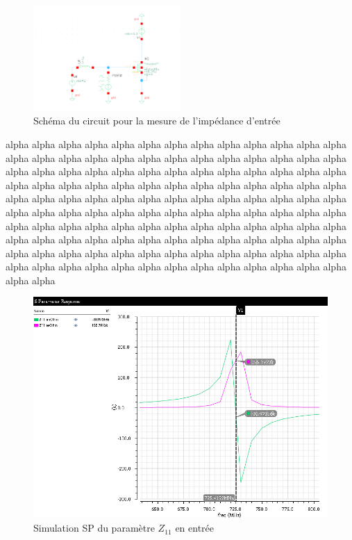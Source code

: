 \documentclass[a4paper]{article}
\begin{document}
\begin{figure}
\centering
\includegraphics[width=0.5\textwidth]{arch-transistor-input-impedance.png}
\caption{Sch\'ema du circuit pour la mesure de l'imp\'edance d'entr\'ee}
\end{figure}

alpha alpha alpha alpha alpha alpha alpha alpha alpha alpha alpha alpha
alpha alpha alpha alpha alpha alpha alpha alpha alpha alpha alpha alpha
alpha alpha alpha alpha alpha alpha alpha alpha alpha alpha alpha alpha
alpha alpha alpha alpha alpha alpha alpha alpha alpha alpha alpha alpha
alpha alpha alpha alpha alpha alpha alpha alpha alpha alpha alpha alpha
alpha alpha alpha alpha alpha alpha alpha alpha alpha alpha alpha alpha
alpha alpha alpha alpha alpha alpha alpha alpha alpha alpha alpha alpha
alpha alpha alpha alpha alpha alpha alpha alpha alpha alpha alpha alpha
alpha alpha alpha alpha alpha alpha alpha alpha alpha alpha alpha alpha
alpha alpha alpha alpha alpha alpha alpha alpha alpha alpha alpha alpha
alpha alpha alpha alpha alpha alpha alpha alpha alpha alpha alpha alpha

\vskip 2cm

\begin{figure}[!htb]
\begin{center}
  \includegraphics[scale=0.40]{sim-input-impedance.png}
  \caption{Simulation SP du param\`etre $Z_{11}$ en entr\'ee}
\end{center}
\end{figure}
\end{document}
